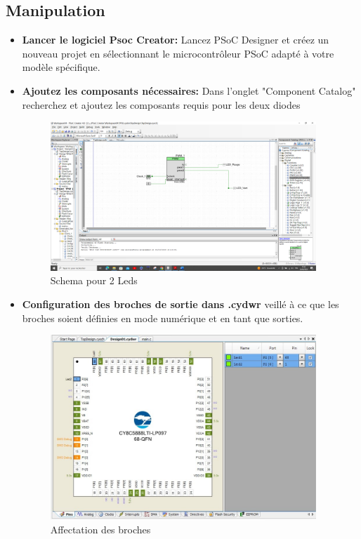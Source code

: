 \subsection{Manipulation}
\label{sec:Manipulation}
\begin{itemize}
    \item \textbf{Lancer le logiciel Psoc Creator:}
    Lancez PSoC Designer et créez un nouveau projet en sélectionnant 
    le microcontrôleur PSoC adapté à votre modèle spécifique.
    \item \textbf{Ajoutez les composants nécessaires: } 
    Dans l'onglet "Component Catalog"
    recherchez et ajoutez les composants requis pour les deux diodes
    \begin{figure}[htp]
        \centering
        \includegraphics[width=10cm]{images/two.png }
        \caption{Schema pour 2 Leds }
        \label{fig:example6}
      \end{figure}
    \item \textbf{Configuration des broches de sortie dans .cydwr}
    veillé à ce que les broches soient définies en mode numérique et en tant que sorties.
    \begin{figure}[htp]
        \centering
        \includegraphics[width=10cm]{images/broche2.jpg }
        \caption{Affectation des broches }
        \label{fig:example7}

\end{figure}
\end{itemize}
